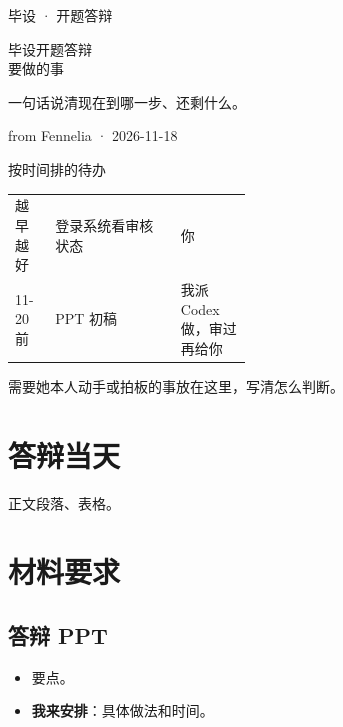 \def\ochretitle{毕设开题答辩 Overview}
\def\ochrefooter{毕设开题答辩 · 2026 年 11 月 18 日}




\thispagestyle{fancy}
{\footnotesize\color{muted}毕设 · 开题答辩}\par
\vspace{10pt}
{\serif\fontsize{30}{40}\selectfont 毕设开题答辩\\要做的事\par}
\vspace{8pt}
{\color{ink2}一句话说清现在到哪一步、还剩什么。\par}
\vspace{4pt}
{\footnotesize\color{muted}from Fennelia · 2026-11-18\par}
\vspace{10pt}\hairline\vspace{6pt}
\noindent{}\hfill
{}\hfill
{}\hfill
{}
\par\vspace{8pt}\hairline\vspace{10pt}

{\serif\fontsize{15}{20}\selectfont 按时间排的待办\par}
\vspace{2pt}
{\small\renewcommand{\arraystretch}{1.1}
\begin{tabularx}{\linewidth}{@{}P{0.17\linewidth}LP{0.3\linewidth}@{}}
\toprule
{} &  &  \\
\midrule
越早越好 & 登录系统看审核状态 & 你 \\
-20 前 & PPT 初稿 & 我派 Codex 做，审过再给你 \\
\bottomrule
\end{tabularx}}

\newpage
\begin{todo}[先看系统里显示什么]
需要她本人动手或拍板的事放在这里，写清怎么判断。
\end{todo}

\vspace{10pt}
\section{答辩当天}
正文段落、表格。

\section{材料要求}
\subsection{答辩 PPT}
\begin{itemize}
\item 要点。
\end{itemize}

\begin{advice}
\begin{itemize}
\item \textbf{我来安排}：具体做法和时间。
\end{itemize}
\end{advice}


